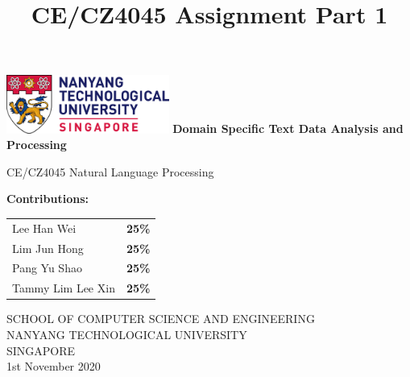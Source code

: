 \documentclass[sigconf,nonacm=true]{acmart}
\newcommand\blankpage{%
	\null
	\thispagestyle{empty}%
	\addtocounter{page}{-1}%
	\newpage}
\begin{document}
	
\begin{titlepage}
	\begin{center}
		\vspace*{1cm}
		\includegraphics[width=0.4\textwidth]{ntu_logo}
		\vspace{0.8cm}
		\linebreak
		\Huge
		\textbf{Domain Specific Text Data Analysis and Processing}
		
		\vspace{0.5cm}
		\LARGE
		CE/CZ4045 Natural Language Processing
		
		\vspace{1.5cm}
		\textbf{Contributions:}\\
		
		\begin{table}[h]
			\begin{tabular}{lc}
				Lee Han Wei &\textbf{ 25\%}\\
				Lim Jun Hong & \textbf{25\%}\\
				Pang Yu Shao & \textbf{25\%}\\
				Tammy Lim Lee Xin & \textbf{25\%}\\
			\end{tabular}
		\end{table}
		

		
		\vfill

		\vspace{0.8cm}
		

		
		\Large
		SCHOOL OF COMPUTER SCIENCE AND ENGINEERING\\
		NANYANG TECHNOLOGICAL UNIVERSITY\\
		SINGAPORE\\
		1st November 2020
		
	\end{center}
\end{titlepage}
\afterpage{\blankpage}

\title{CE/CZ4045 Assignment Part 1}

\end{document}
